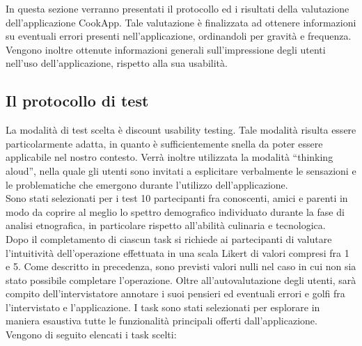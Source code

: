 In questa sezione verranno presentati il protocollo ed i risultati della valutazione
dell'applicazione CookApp. Tale valutazione è finalizzata ad ottenere informazioni su
eventuali errori presenti nell'applicazione, ordinandoli per gravità e frequenza. Vengono
inoltre ottenute informazioni generali sull'impressione degli utenti nell'uso dell'applicazione,
rispetto alla sua usabilità.

\subsection{Il protocollo di test}
La modalità di test scelta è discount usability testing. Tale modalità risulta essere particolarmente
adatta, in quanto è sufficientemente snella da poter essere applicabile nel nostro contesto.
Verrà inoltre utilizzata la modalità ``thinking aloud'', nella quale gli utenti sono invitati a esplicitare
verbalmente le sensazioni e le problematiche che emergono durante l'utilizzo dell'applicazione.\\
Sono stati selezionati per i test 10 partecipanti fra conoscenti, amici e parenti in modo da coprire al meglio lo spettro
demografico individuato durante la fase di analisi etnografica, in particolare rispetto all'abilità culinaria e tecnologica.\\
Dopo il completamento di ciascun task si richiede ai partecipanti di valutare l'intuitività dell'operazione effettuata in una scala
Likert di valori compresi fra 1 e 5. Come descritto in precedenza, sono previsti valori nulli nel caso in cui non sia stato
possibile completare l'operazione. Oltre all'autovalutazione degli utenti, sarà compito dell'intervistatore annotare i suoi pensieri
ed eventuali errori e golfi fra l'intervistato e l'applicazione.
I task sono stati selezionati per esplorare in maniera esaustiva tutte le funzionalità principali offerti dall'applicazione.
Vengono di seguito elencati i task scelti:
